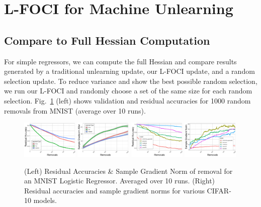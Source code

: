 \section{L-FOCI for Machine Unlearning}

\subsection{Compare to Full Hessian Computation}
For simple regressors, we can compute the full Hessian and compare results generated by a traditional unlearning update, our L-FOCI update, and a random selection update. To reduce variance and show the best possible random selection, we run our L-FOCI and randomly choose a set of the same size for each random selection. Fig.~\ref{fig:mnistcifar} (left) shows validation and residual accuracies for 1000 random removals from MNIST (average over 10 runs). 

\begin{figure}
    \centering
    \includegraphics[width=0.24\textwidth]{5_unlearn/figs/scrub/MNIST_Resid_Acc.png}
     \includegraphics[width=0.24\textwidth]{5_unlearn/figs/scrub/MNIST_GradNorm_Logistic.png}
    \includegraphics[width=0.24\textwidth]{5_unlearn/figs/scrub/cifar_resid.png}
    \includegraphics[width=0.24\textwidth]{5_unlearn/figs/scrub/CIFAR_gradnom.png}
    \caption{(Left) Residual Accuracies \& Sample Gradient Norm of removal for an MNIST Logistic Regressor. Averaged over 10 runs. (Right) Residual accuracies and sample gradient norms for various CIFAR-10 models.}
    \label{fig:mnistcifar}
\end{figure}


